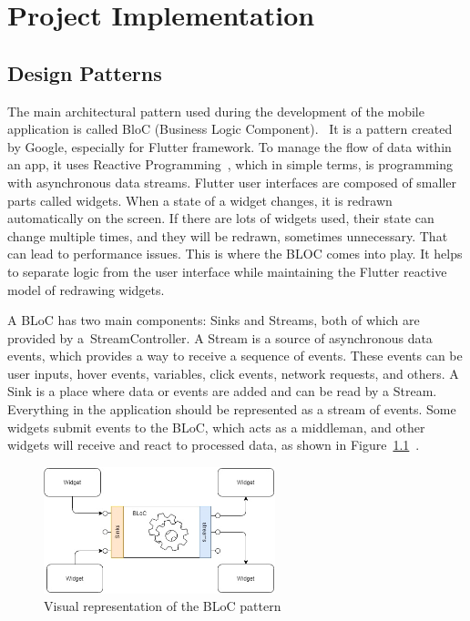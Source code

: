 \chapter{Project Implementation}
\section{Design Patterns}
The main architectural pattern used during the development of the mobile application is called BloC (Business Logic Component).~\cite{bloc-pattern} It is a pattern created by Google, especially for Flutter framework. To manage the flow of data within an app, it uses Reactive Programming~\cite{reactive-programming}, which in simple terms, is programming with asynchronous data streams. Flutter user interfaces are composed of smaller parts called widgets. When a state of a widget changes, it is redrawn automatically on the screen. If there are lots of widgets used, their state can change multiple times, and they will be redrawn, sometimes unnecessary. That can lead to performance issues. This is where the BLOC comes into play. It helps to separate logic from the user interface while maintaining the Flutter reactive model of redrawing widgets.

A BLoC has two main components: Sinks and Streams, both of which are provided by a~StreamController. A Stream is a source of asynchronous data events, which provides a way to receive a sequence of events. These events can be user inputs, hover events, variables, click events, network requests, and others. A Sink is a place where data or events are added and can be read by a Stream. Everything in the application should be represented as a stream of events. Some widgets submit events to the BLoC, which acts as a middleman, and other widgets will receive and react to processed data, as shown in Figure~\ref{fig:bloc-pattern}~\cite{bloc-image}.

\begin{figure}[htb]
    \centering
    \includegraphics[width=0.6\textwidth]{fig04/bloc_pattern.png}
    \caption{Visual representation of the BLoC pattern} \label{fig:bloc-pattern}
\end{figure}

